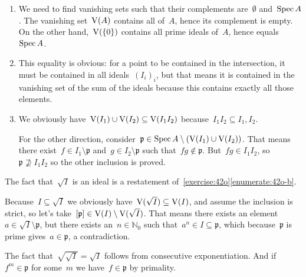 \begin{exercise}
  \label{exercise:44c}
  \begin{enumerate}
    \item\label{enumerate:44c-a} We need to find vanishing sets such that their complements are~$\emptyset$ and~$\operatorname{Spec} A$. The vanishing set~$\operatorname{V}(A)$ contains all of~$A$, hence its complement is empty. On the other hand,~$\operatorname{V}(\left\{ 0 \right\})$ contains all prime ideals of~$A$, hence equals~$\operatorname{Spec} A$.

    \item This equality is obvious: for a point to be contained in the intersection, it must be contained in all ideals~$(I_i)_i$, but that means it is contained in the vanishing set of the sum of the ideals because this contains exactly all those elements.

    \item We obviously have~$\operatorname{V}(I_1)\cup\operatorname{V}(I_2)\subseteq\operatorname{V}(I_1I_2)$ because~$I_1I_2\subseteq I_1,I_2$.

      For the other direction, consider~$\mathfrak{p}\in\operatorname{Spec} A\setminus(\operatorname{V}(I_1)\cup\operatorname{V}(I_2))$. That means there exist~$f\in I_1\setminus\mathfrak{p}$ and~$g\in I_2\setminus\mathfrak{p}$ such that~$fg\notin\mathfrak{p}$. But~$fg\in I_1I_2$, so~$\mathfrak{p}\nsupseteq I_1I_2$ so the other inclusion is proved.
  \end{enumerate}
\end{exercise}

\begin{exercise}
  \label{exercise:44d}
  The fact that~$\sqrt{I}$ is an ideal is a restatement of~\autoref{exercise:42o}\ref{enumerate:42o-b}.
  
  Because~$I\subseteq\sqrt{I}$ we obviously have~$\operatorname{V}(\sqrt{I})\subseteq\operatorname{V}(I)$, and assume the inclusion is strict, so let's take~$[\mathfrak{p}]\in\operatorname{V}(I)\setminus\operatorname{V}(\sqrt{I})$. That means there exists an element~$a\in\sqrt{I}\setminus\mathfrak{p}$, but there exists an~$n\in\mathbb{N}_0$ such that~$a^n\in I\subseteq\mathfrak{p}$, which because~$\mathfrak{p}$ is prime gives~$a\in\mathfrak{p}$, a contradiction.

  The fact that~$\sqrt{\sqrt{I}}=\sqrt{I}$ follows from consecutive exponentiation. And if~$f^m\in\mathfrak{p}$ for some~$m$ we have~$f\in\mathfrak{p}$ by primality.
\end{exercise}

